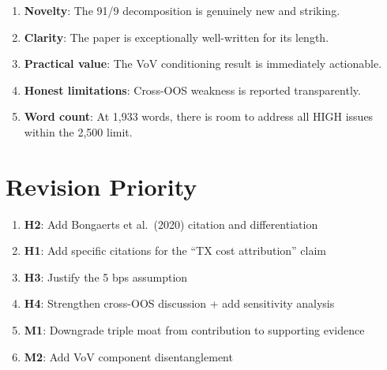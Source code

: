 \documentclass[12pt,a4paper]{article}
\begin{document}
\begin{enumerate}
\item \textbf{Novelty}: The 91/9 decomposition is genuinely new and striking.
\item \textbf{Clarity}: The paper is exceptionally well-written for its length.
\item \textbf{Practical value}: The VoV conditioning result is immediately actionable.
\item \textbf{Honest limitations}: Cross-OOS weakness is reported transparently.
\item \textbf{Word count}: At 1,933 words, there is room to address all HIGH issues within the 2,500 limit.
\end{enumerate}

\section*{Revision Priority}

\begin{enumerate}
\item \textbf{H2}: Add Bongaerts et al.\ (2020) citation and differentiation
\item \textbf{H1}: Add specific citations for the ``TX cost attribution'' claim
\item \textbf{H3}: Justify the 5 bps assumption
\item \textbf{H4}: Strengthen cross-OOS discussion + add sensitivity analysis
\item \textbf{M1}: Downgrade triple moat from contribution to supporting evidence
\item \textbf{M2}: Add VoV component disentanglement
\end{enumerate}
\end{document}

